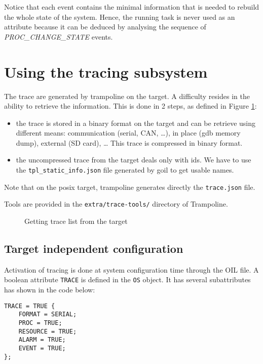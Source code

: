 Notice that each event contains the minimal information that is needed
to rebuild the whole state of the system.
Hence, the running task is never used as an attribute because it can be deduced
by analysing the sequence of \emph{PROC\_CHANGE\_STATE} events.

\section{Using the tracing subsystem}

The trace are generated by trampoline on the target. A difficulty resides in the ability to retrieve the information. This is done in 2 steps, as defined in Figure \ref{fig:trace}:
\begin{itemize}
	\item the trace is stored in a binary format on the target and can be retrieve using different means: communication (serial, CAN, …), in place (gdb memory dump), external (SD card), … This trace is compressed in binary format.
	\item the uncompressed trace from the target deals only with ids. We have to use the \texttt{tpl_static_info.json} file generated by goil to get usable names.
\end{itemize}
Note that on the posix target, trampoline generates directly the \texttt{trace.json} file.

Tools are provided in the \texttt{extra/trace-tools/} directory of Trampoline.
\begin{figure}[htbp]
    \centering
	\begin{adjustbox}{width=.7\linewidth,keepaspectratio}
		
	\end{adjustbox}
	\caption{Getting trace list from the target}
	\label{fig:trace}
\end{figure}

\subsection{Target independent configuration}

Activation of tracing is done at system configuration time through the OIL file.
A boolean attribute \texttt{TRACE} is defined in the \texttt{OS} object. It has
several subattributes has shown in the code below:

\begin{lstlisting}[language=OIL]
TRACE = TRUE {
    FORMAT = SERIAL;
    PROC = TRUE;
    RESOURCE = TRUE;
    ALARM = TRUE;
    EVENT = TRUE;
};
\end{lstlisting}

